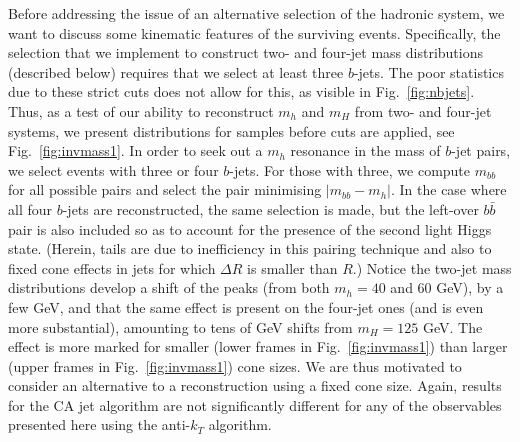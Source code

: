 \documentclass[12pt]{article}
\begin{document}
Before addressing the issue of an alternative selection of the hadronic system,  we want to discuss some kinematic features of the surviving events.
Specifically, the selection that we implement to construct two- and four-jet mass distributions (described below) requires that we select at least three $b$-jets. The poor statistics due to these strict cuts does not allow for this, as  visible in Fig.~\ref{fig:nbjets}. Thus, as a  test of our ability to reconstruct $m_h$ and $m_H$ from two- and four-jet systems, we present distributions for samples before cuts are applied, see Fig.~\ref{fig:invmass1}. In order to seek out a $m_h$ resonance in the mass of $b$-jet pairs, we select events with three or four $b$-jets. For those with three, we compute $m_{bb}$ for all possible pairs and select the pair minimising $|m_{bb}-m_h|$. In the case where all four $b$-jets are reconstructed, the same selection is made, but the left-over $b\bar b$ pair is also included so as to account for the presence of the second light Higgs state. (Herein, tails are due to inefficiency in this pairing technique and also to fixed cone effects in jets for which $\Delta R$  is smaller than $R$.)
%
Notice the two-jet mass distributions develop a shift of the peaks (from both $m_h=40$ and 60 GeV), by a few GeV, and that the same effect is present on the four-jet ones (and is even more substantial), amounting to tens of GeV shifts from $m_H=125$ GeV. The effect is more marked for smaller (lower frames in    Fig.~\ref{fig:invmass1}) than larger (upper frames in  Fig.~\ref{fig:invmass1}) cone sizes. We are thus motivated to consider an alternative to a reconstruction using a fixed cone size. Again, results for the CA jet algorithm are not significantly different for any of the observables presented here using the anti-$k_T$ algorithm.
\end{document}
